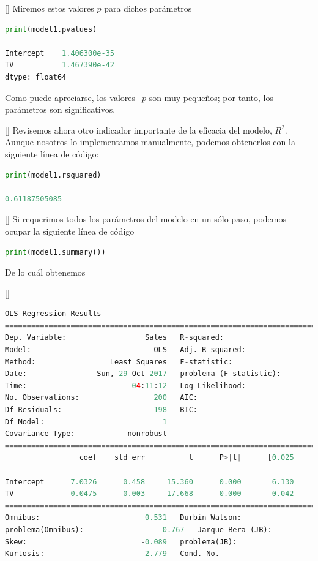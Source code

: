 []
 Miremos estos valores $p$ para dichos parámetros
\begin{lstlisting}[language=Python]
print(model1.pvalues)

Intercept    1.406300e-35
TV           1.467390e-42
dtype: float64
\end{lstlisting}

Como puede apreciarse, los valores$-p$ son muy pequeños; por tanto, los parámetros son significativos.

[]{}
Revisemos ahora otro indicador importante de la eficacia del modelo, $R^{2}.$ Aunque nosotros lo implementamos manualmente, podemos obtenerlos con la siguiente línea de código:
\begin{lstlisting}[language=Python]
print(model1.rsquared)

0.61187505085
\end{lstlisting}


[]{}
Si requerimos todos los parámetros del modelo en un sólo paso, podemos ocupar la siguiente línea de código
\begin{lstlisting}[language=Python]
print(model1.summary())
\end{lstlisting}
De lo cuál obtenemos

[]
\begin{lstlisting}[language=Python]
                            OLS Regression Results
==============================================================================
Dep. Variable:                  Sales   R-squared:                       0.612
Model:                            OLS   Adj. R-squared:                  0.610
Method:                 Least Squares   F-statistic:                     312.1
Date:                Sun, 29 Oct 2017   problema (F-statistic):           1.47e-42
Time:                        04:11:12   Log-Likelihood:                -519.05
No. Observations:                 200   AIC:                             1042.
Df Residuals:                     198   BIC:                             1049.
Df Model:                           1
Covariance Type:            nonrobust
==============================================================================
                 coef    std err          t      P>|t|      [0.025      0.975]
------------------------------------------------------------------------------
Intercept      7.0326      0.458     15.360      0.000       6.130       7.935
TV             0.0475      0.003     17.668      0.000       0.042       0.053
==============================================================================
Omnibus:                        0.531   Durbin-Watson:                   1.935
problema(Omnibus):                  0.767   Jarque-Bera (JB):                0.669
Skew:                          -0.089   problema(JB):                        0.716
Kurtosis:                       2.779   Cond. No.                         338.
\end{lstlisting}



